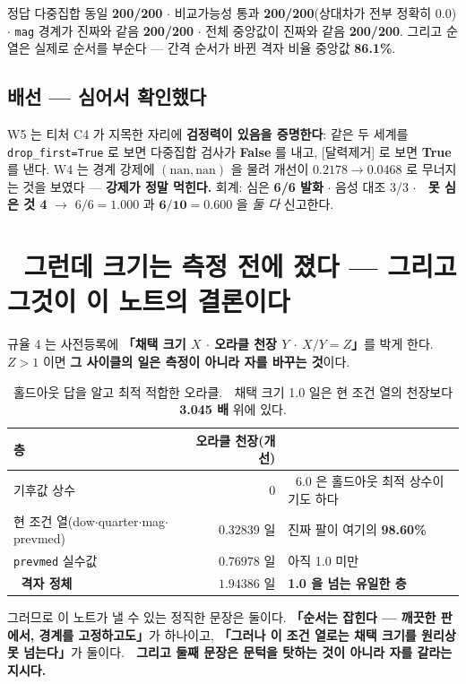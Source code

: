\documentclass{article}
\begin{document}
정답 다중집합 동일 \textbf{200/200} $\cdot$ 비교가능성 통과 \textbf{200/200}(상대차가 전부 정확히 $0.0$) $\cdot$
\texttt{mag} 경계가 진짜와 같음 \textbf{200/200} $\cdot$ 전체 중앙값이 진짜와 같음 \textbf{200/200}.
그리고 순열은 실제로 순서를 부순다 --- 간격 순서가 바뀐 격자 비율 중앙값 \textbf{86.1\%}.

\subsection{배선 --- 심어서 확인했다}

W5 는 티처 C4 가 지목한 자리에 \textbf{검정력이 있음을 증명한다}:
같은 두 세계를 \texttt{drop\_first=True} 로 보면 다중집합 검사가 \textbf{False} 를 내고,
[달력제거] 로 보면 \textbf{True} 를 낸다. W4 는 경계 강제에 $(\mathrm{nan},\mathrm{nan})$ 을 물려
개선이 $0.2178 \to 0.0468$ 로 무너지는 것을 보였다 --- \textbf{강제가 정말 먹힌다.}
회계: 심은 \textbf{6/6 발화} $\cdot$ 음성 대조 3/3 $\cdot$ 🔴 \textbf{못 심은 것 4}
$\to$ $6/6=1.000$ 과 $\mathbf{6/10=0.600}$ 을 \emph{둘 다} 신고한다.

\section{🔴 그런데 크기는 측정 전에 졌다 --- 그리고 그것이 이 노트의 결론이다}

규율 4 는 사전등록에 \textbf{「채택 크기 $X$ $\cdot$ 오라클 천장 $Y$ $\cdot$ $X/Y=Z$」}를 박게 한다.
$Z>1$ 이면 \textbf{그 사이클의 일은 측정이 아니라 자를 바꾸는 것}이다.

\begin{table}[h]\centering\small
\begin{tabular}{lrl}
\toprule
층 & 오라클 천장(개선) & \\
\midrule
기후값 상수 & $0$ & 🔴 $6.0$ 은 홀드아웃 최적 상수이기도 하다 \\
현 조건 열(dow$\cdot$quarter$\cdot$mag$\cdot$prevmed) & $\mathbf{0.32839}$ 일 & 진짜 팔이 여기의 \textbf{98.60\%} \\
\texttt{prevmed} 실수값 & $0.76978$ 일 & 아직 1.0 미만 \\
🔴 \textbf{격자 정체} & $\mathbf{1.94386}$ 일 & \textbf{1.0 을 넘는 유일한 층} \\
\bottomrule
\end{tabular}
\caption{홀드아웃 답을 알고 최적 적합한 오라클. 🔴 채택 크기 1.0 일은
현 조건 열의 천장보다 \textbf{3.045 배} 위에 있다.}
\end{table}

그러므로 이 노트가 낼 수 있는 정직한 문장은 둘이다.
\textbf{「순서는 잡힌다 --- 깨끗한 판에서, 경계를 고정하고도」}가 하나이고,
\textbf{「그러나 이 조건 열로는 채택 크기를 원리상 못 넘는다」}가 둘이다.
🔴 \textbf{그리고 둘째 문장은 문턱을 탓하는 것이 아니라 자를 갈라는 지시다.}
\end{document}
